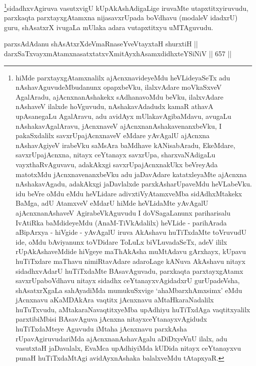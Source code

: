 \begin{artha}
\footnote{hiMde parxtayxgAtamxnalilx ajAcnxnavideyeMdu heVLideyaSeTx
adu nAshavAguvudeMbudanunx opapxbeVku, ilalxvAdare moVkaSxveV
AgalAradu, ajAcnxnanAshakekx sAdhanavoMdu beVku, ilalxvAdare
nAshaveV ilalxde hoVguvudu, nAshakavAdadudx kamaR athavA upAsanegaLu
AgalAravu, adu avidAyx mUlakavAgibaMdavu, avugaLu nAshakavAgalAravu,
jAcnxnaveV ajAcnxnanAshakavenanxbeVku, I pakaSxdalilx
savxrUpajAcnxnaveV eMdare yAvAgalU ajAcnxna nAshavAgiyeV irabeVku
saMsAra baMdhave kANisabAradu, EkeMdare, savxrUpajAcnxna, nitayx
ceYtanayx savxrUpa, sharxvaNAdigaLu vayxthaRvAguvavu, adakAkxgi
savxrUpajAcnxnakUkx beVreyAda matotxMdu jAcnxnavenanxbeVku adu
jaDavAdare katatxleyaMte ajAcnxna nAshakavAgadu, adakAkxgi
jaDavlalxde parxkAsharUpaveMdu heVLabeVku. idu beVre oMdu eMdu
heVLidare adivxtiVyAtamxveMba sidAdhxMtakekx BaMga, adU AtamxveV
eMdarU hiMde heVLidaMte yAvAgalU ajAcnxnanAshaveV AgirabeVkAguvudu
I doVSagaLanunx pariharisalu  IvAtiRka baMdideyeMdu
(AnaM-TiVkAdalilx) heVLide - parihArada aBipArxya - hiVgide -
yAvAgalU iruva AkAshavu huTiTxdaMte toVruvudU ide, oMdu bAviyanunx
toVDidare ToLuLx biVLuvadaSeTx, adeV ililx rUpAkAshaveMdide hiVgeye
maThAkAsha muMtAdavu gArxhayx, kUpavu huTiTxdare maThavu
nimiRtavAdare adaroLage kANuva AkAshavu nitayx sidadhxvAdarU
huTiTxdaMte BAsavAguvadu, parxkaqta parxtayxgAtamx savxrUpaboVdhavu
nitayx sidadhx ceYtanayxvAgidadxrU gurUpadeVsha, shAsatxrXgaLa
sahAyadiMda mumukuSxvige `ahaMbarxhAmxsimx' eMdu jAcnxnavu
aKaMDAkAra vaqtitx jAcnxnavu aMtaHkaraNadalilx huTuTxvudu,
aMtakaraNavaqtitxyeMba upAdhiyu huTiTxdAga vaqtitxyalilx
parxtibiMbisi BAsavAguva jAcnxna nitayxceYtanayxvAgidudx
huTiTxdaMteye Aguvudu iMtaha jAcnxnavu parxkAsha rUpavAgiruvudariMda
ajAcnxnanAshavAgalu aDiDxyeVnU ilalx, adu vasutxtaH jaDavalalx, EvaMca
upAdhiyiMda kUDida nitayx ceYtanayxvu punaH huTiTxdaMtAgi
avidAyxnAshaka balalxveMdu tAtapxyaR.}sidadhxvAgiruva vasutxvigU kUpAkAshAdigaLige iruvaMte
utapxtitxyiruvudu, parxkaqta parxtayxgAtamxna nijasavxrUpada boVdhavu
(modaleV idadxrU) guru, shAsatxrX ivugaLa mUlaka adara vutapxtitxyu
uMTAguvudu.
\end{artha}


\begin{shl}
parxsAdAdanu shAsAtxrXdeVmaRnaseYveVtayxtaH shurxtiH || \\
darxSaTxvayxmAtamxnasatxtatxvXmitAyxhAsamxdidhxteYSiNiV \hfill || 657 ||  
\end{shl}


